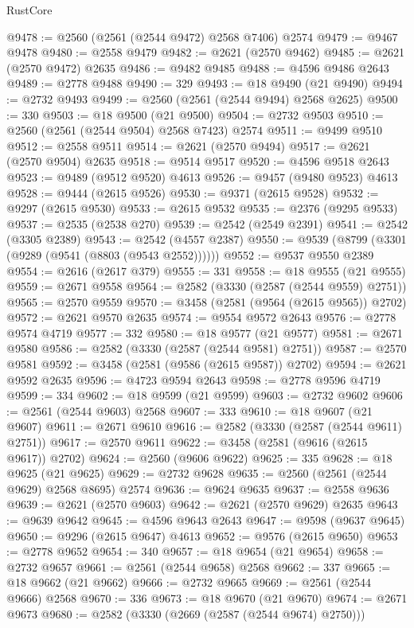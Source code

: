 \begin{lexlean}{RustCore}
\begin{coremodule}
@9478 := @2560 (@2561 (@2544 @9472) @2568 @7406) @2574
@9479 := @9467 @9478
@9480 := @2558 @9479
@9482 := @2621 (@2570 @9462)
@9485 := @2621 (@2570 @9472) @2635
@9486 := @9482 @9485
@9488 := @4596 @9486 @2643
@9489 := @2778 @9488
@9490 := 329
@9493 := @18 @9490 (@21 @9490)
@9494 := @2732 @9493
@9499 := @2560 (@2561 (@2544 @9494) @2568 @2625)
@9500 := 330
@9503 := @18 @9500 (@21 @9500)
@9504 := @2732 @9503
@9510 := @2560 (@2561 (@2544 @9504) @2568 @7423) @2574
@9511 := @9499 @9510
@9512 := @2558 @9511
@9514 := @2621 (@2570 @9494)
@9517 := @2621 (@2570 @9504) @2635
@9518 := @9514 @9517
@9520 := @4596 @9518 @2643
@9523 := @9489 (@9512 @9520) @4613
@9526 := @9457 (@9480 @9523) @4613
@9528 := @9444 (@2615 @9526)
@9530 := @9371 (@2615 @9528)
@9532 := @9297 (@2615 @9530)
@9533 := @2615 @9532
@9535 := @2376 (@9295 @9533)
@9537 := @2535 (@2538 @270)
@9539 := @2542 (@2549 @2391)
@9541 := @2542 (@3305 @2389)
@9543 := @2542 (@4557 @2387)
@9550 := @9539 (@8799 (@3301 (@9289 (@9541 (@8803 (@9543 @2552))))))
@9552 := @9537 @9550 @2389
@9554 := @2616 (@2617 @379)
@9555 := 331
@9558 := @18 @9555 (@21 @9555)
@9559 := @2671 @9558
@9564 := @2582 (@3330 (@2587 (@2544 @9559) @2751))
@9565 := @2570 @9559
@9570 := @3458 (@2581 (@9564 (@2615 @9565)) @2702)
@9572 := @2621 @9570 @2635
@9574 := @9554 @9572 @2643
@9576 := @2778 @9574 @4719
@9577 := 332
@9580 := @18 @9577 (@21 @9577)
@9581 := @2671 @9580
@9586 := @2582 (@3330 (@2587 (@2544 @9581) @2751))
@9587 := @2570 @9581
@9592 := @3458 (@2581 (@9586 (@2615 @9587)) @2702)
@9594 := @2621 @9592 @2635
@9596 := @4723 @9594 @2643
@9598 := @2778 @9596 @4719
@9599 := 334
@9602 := @18 @9599 (@21 @9599)
@9603 := @2732 @9602
@9606 := @2561 (@2544 @9603) @2568
@9607 := 333
@9610 := @18 @9607 (@21 @9607)
@9611 := @2671 @9610
@9616 := @2582 (@3330 (@2587 (@2544 @9611) @2751))
@9617 := @2570 @9611
@9622 := @3458 (@2581 (@9616 (@2615 @9617)) @2702)
@9624 := @2560 (@9606 @9622)
@9625 := 335
@9628 := @18 @9625 (@21 @9625)
@9629 := @2732 @9628
@9635 := @2560 (@2561 (@2544 @9629) @2568 @8695) @2574
@9636 := @9624 @9635
@9637 := @2558 @9636
@9639 := @2621 (@2570 @9603)
@9642 := @2621 (@2570 @9629) @2635
@9643 := @9639 @9642
@9645 := @4596 @9643 @2643
@9647 := @9598 (@9637 @9645)
@9650 := @9296 (@2615 @9647) @4613
@9652 := @9576 (@2615 @9650)
@9653 := @2778 @9652
@9654 := 340
@9657 := @18 @9654 (@21 @9654)
@9658 := @2732 @9657
@9661 := @2561 (@2544 @9658) @2568
@9662 := 337
@9665 := @18 @9662 (@21 @9662)
@9666 := @2732 @9665
@9669 := @2561 (@2544 @9666) @2568
@9670 := 336
@9673 := @18 @9670 (@21 @9670)
@9674 := @2671 @9673
@9680 := @2582 (@3330 (@2669 (@2587 (@2544 @9674) @2750)))

\end{coremodule}
\end{lexlean}
